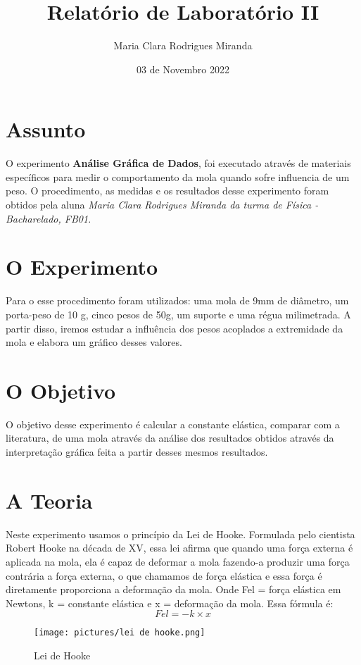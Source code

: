 \documentclass[a4paper, 12pt]{article}
\title{Relatório de Laboratório II}
\author{Maria Clara Rodrigues Miranda}
\date{03 de Novembro 2022}
\begin{document}
\maketitle

\section{Assunto}
O experimento \textbf{Análise Gráfica de Dados}, foi executado através de materiais específicos para medir o comportamento da mola quando sofre influencia de um peso. O procedimento, as medidas e os resultados desse experimento foram obtidos pela aluna \textit{Maria Clara Rodrigues Miranda da turma de Física - Bacharelado, FB01.}

\section{O Experimento}
Para o esse procedimento foram utilizados: uma mola de 9mm de diâmetro, um porta-peso de 10 g, cinco pesos de 50g, um suporte e uma régua milimetrada. A partir disso, iremos estudar a influência dos pesos acoplados a extremidade da mola e elabora um gráfico desses valores.

\section{O Objetivo}
O objetivo desse experimento é calcular a constante elástica, comparar com a literatura, de uma mola através da análise dos resultados obtidos através da interpretação gráfica feita a partir desses mesmos resultados.

\section{A Teoria}
Neste experimento usamos o princípio da Lei de Hooke. Formulada pelo cientista Robert Hooke na década de XV, essa lei afirma que quando uma força externa é aplicada na mola, ela é capaz de deformar a mola fazendo-a produzir uma força contrária a força externa, o que chamamos de força elástica e essa força é diretamente proporciona a deformação da mola. Onde Fel = força elástica em Newtons, k = constante elástica e x = deformação da mola. Essa fórmula é:
\begin{equation}
    Fel = -k \times x
\end{equation}

\begin{figure}[!ht]
\centering 
\texttt{[image: pictures/lei de hooke.png]} 
\caption{Lei de Hooke} 
\label{Fig01} 
\end{figure}
\end{document}
